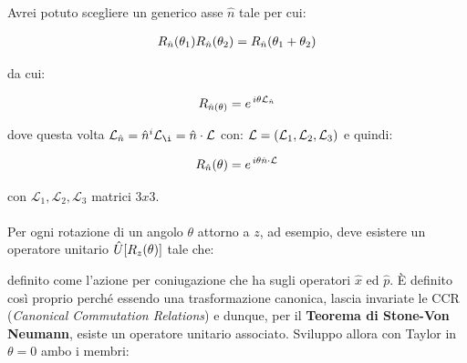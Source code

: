 	Avrei potuto scegliere un generico asse $\hat{n}$ tale per cui:
	
\begin{align*}
	R_{\hat{n}}\qty(\theta_1) R_{\hat{n}}\qty(\theta_2) = R_{\hat{n}}\qty(\theta_1 + \theta_2)
\end{align*}

	da cui:
	
\begin{align*}
	R_{\hat{n}\qty(\theta)} = e^{\, i \theta \mathcal{L}_{\hat{n}}}
\end{align*}

	dove questa volta $\mathcal{L}_{\hat{n}} = \hat{n}^i \mathcal{L}_{\i}= \hat{n} \cdot \vb{\mathcal{L}}$ con: $\vb{\mathcal{L}} = \qty(\mathcal{L}_1, \mathcal{L}_2, \mathcal{L}_3)$ e quindi:
	
\begin{align*}
	R_{\hat{n}}\qty(\theta) = e^{\, i \theta \hat{n} \cdot \vb{\mathcal{L}}}
\end{align*}

	con $\mathcal{L}_1, \mathcal{L}_2, \mathcal{L}_3$ matrici $3 x 3$.
	\\
	\\
	Per ogni rotazione di un angolo $\theta$ attorno a $z$, ad esempio, deve esistere un operatore unitario $\hat{U}\qty[R_z\qty(\theta)]$ tale che:
	

	definito come l'azione per coniugazione che ha sugli operatori $\hat{x}$ ed $\hat{p}$. È definito così proprio perché essendo una trasformazione canonica, lascia invariate le CCR (\textit{Canonical Commutation Relations}) e dunque, per il \textbf{Teorema di Stone-Von Neumann}, esiste un operatore unitario associato. Sviluppo allora con Taylor in $\theta = 0$ ambo i membri:
	
